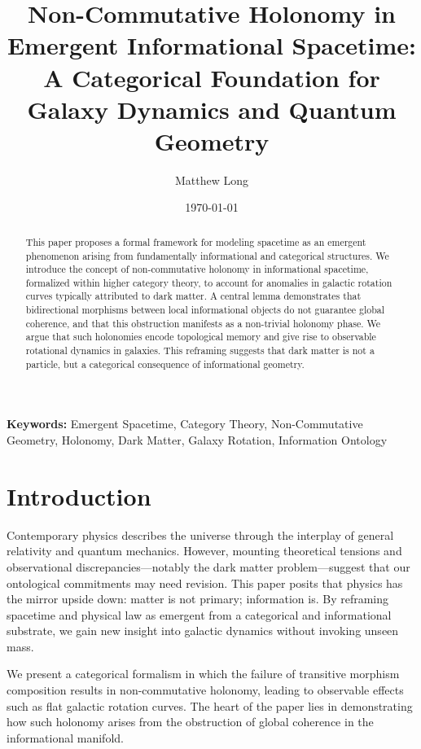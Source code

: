 \documentclass[11pt]{article}
\title{Non-Commutative Holonomy in Emergent Informational Spacetime: A Categorical Foundation for Galaxy Dynamics and Quantum Geometry}
\author[1]{Matthew Long}
\affil[1]{Yoneda AI, Category Research Division, \texttt{matthew@yoneda.ai}}
\date{\today}
\begin{document}
\maketitle

\begin{abstract}
This paper proposes a formal framework for modeling spacetime as an emergent phenomenon arising from fundamentally informational and categorical structures. We introduce the concept of non-commutative holonomy in informational spacetime, formalized within higher category theory, to account for anomalies in galactic rotation curves typically attributed to dark matter. A central lemma demonstrates that bidirectional morphisms between local informational objects do not guarantee global coherence, and that this obstruction manifests as a non-trivial holonomy phase. We argue that such holonomies encode topological memory and give rise to observable rotational dynamics in galaxies. This reframing suggests that dark matter is not a particle, but a categorical consequence of informational geometry.
\end{abstract}

\vspace{1em}
\noindent \textbf{Keywords:} Emergent Spacetime, Category Theory, Non-Commutative Geometry, Holonomy, Dark Matter, Galaxy Rotation, Information Ontology

\tableofcontents

\section{Introduction}

Contemporary physics describes the universe through the interplay of general relativity and quantum mechanics. However, mounting theoretical tensions and observational discrepancies---notably the dark matter problem---suggest that our ontological commitments may need revision. This paper posits that physics has the mirror upside down: matter is not primary; information is. By reframing spacetime and physical law as emergent from a categorical and informational substrate, we gain new insight into galactic dynamics without invoking unseen mass.

We present a categorical formalism in which the failure of transitive morphism composition results in non-commutative holonomy, leading to observable effects such as flat galactic rotation curves. The heart of the paper lies in demonstrating how such holonomy arises from the obstruction of global coherence in the informational manifold.
\end{document}
